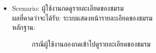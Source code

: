 \documentclass[14pt,oneside,openright,a4paper]{cpe-thai-project}
\begin{document}
\begin{itemize}
  \item Scenario: ผู้ใช้งานกดดูรายละเอียดของชมรม
  \\ผลที่คาดว่าจะได้รับ: ระบบแสดงหน้ารายละเอียดของชมรม
  \\หลักฐาน:\\
  \begin{figure}[!h]\centering
    \setlength{\fboxrule}{0.5mm} %
    \setlength{\fboxsep}{0.5cm}
    \caption{กรณีผู้ใช้งานลองกดเข้าไปดูรายละเอียดของชมรม}\label{fig:FeedPageClubTest}
  \end{figure}
\end{itemize}

\newpage
\end{document}
